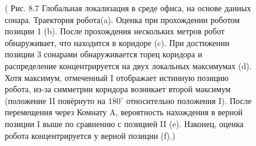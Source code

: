 \documentclass[10pt,a4paper]{article}
\begin{document}
\begin{figure}[H]
	\caption{ ( Рис. 8.7  Глобальная локализация в среде офиса, на основе данных сонара.   Траектория робота(a). Оценка при прохождении роботом позиции 1 (b). После прохождения нескольких метров робот обнаруживает, что находится в коридоре (c). При достижении позиции 3 сонарами обнаруживается торец коридора и распределение концентрируется на двух локальных максимумах (d). Хотя максимум, отмеченный I отображает истинную позицию робота, из-за симметрии коридора возникает второй максимум (положение II повёрнуто на $180^\circ$ относительно положения I). После перемещения через Комнату A, вероятность нахождения в верной позиции I выше по сравнению с позицией II (e). Наконец, оценка робота концентрируется у верной позиции (f).)}
	\label{fig:87orig}
\end{figure}
\end{document}
